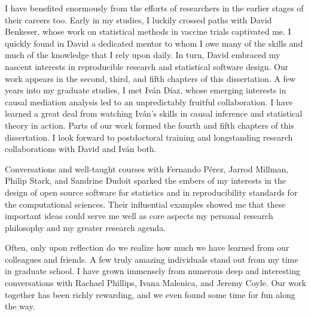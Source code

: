 \documentclass{ucbthesis}
\begin{document}
\begin{frontmatter}
\begin{acknowledgements}
I have benefited enormously from the efforts of researchers in the earlier
stages of their careers too. Early in my studies, I luckily crossed paths with
David Benkeser, whose work on statistical methods in vaccine trials captivated
me. I quickly found in David a dedicated mentor to whom I owe many of the skills
and much of the knowledge that I rely upon daily. In turn, David embraced my
nascent interests in reproducible research and statistical software design. Our
work appears in the second, third, and fifth chapters of this dissertation.
A few years into my graduate studies, I met Iv\'{a}n D\'{i}az, whose emerging
interests in causal mediation analysis led to an unpredictably fruitful
collaboration. I have learned a great deal from watching Iv\'{a}n's skills in
causal inference and statistical theory in action. Parts of our work formed the
fourth and fifth chapters of this dissertation. I look forward to postdoctoral
training and longstanding research collaborations with David and Iv\'{a}n both.

Conversations and well-taught courses with Fernando P{\'e}rez, Jarrod Millman,
Philip Stark, and Sandrine Dudoit sparked the embers of my interests in the
design of open source software for statistics and in reproducibility standards
for the computational sciences. Their influential examples showed me that these
important ideas could serve me well as core aspects my personal research
philosophy and my greater research agenda.

Often, only upon reflection do we realize how much we have learned from our
colleagues and friends. A few truly amazing individuals stand out from my time
in graduate school. I have grown immensely from numerous deep and interesting
conversations with Rachael Phillips, Ivana Malenica, and Jeremy Coyle. Our work
together has been richly rewarding, and we even found some time for fun along
the way.

\end{acknowledgements}

\end{frontmatter}

\pagestyle{headings}










\printbibliography
\end{document}
